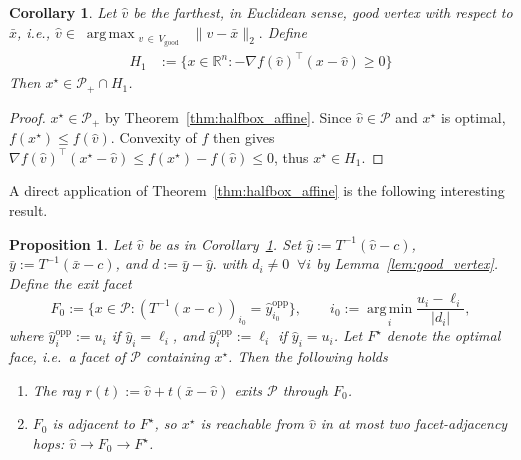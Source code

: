 \documentclass[pdflatex,sn-mathphys-num]{sn-jnl}%
\theoremstyle{thmstyleone}%
\newtheorem{proposition}[theorem]{Proposition}%
\newtheorem{corollary}[theorem]{Corollary}%
\theoremstyle{thmstyletwo}%
\theoremstyle{thmstylethree}%
\theoremstyle{thmstylethree}%
\begin{document}
\begin{corollary}\label{cor:three_halfspaces}
Let $\hat v$ be the farthest, in Euclidean sense, good vertex with respect to $\bar x$, i.e., $
  \hat v \in \; \operatorname*{arg\,max}_{\substack{v\,\in\, V_\text{good}}}\;
                \|v - \bar x\|_2. $
Define
\begin{align*}
  H_1 &:= \bigl\{x\in\mathbb{R}^n : {-}\nabla f(\hat v)^\top(x-\hat v)\ge 0\bigr\}
\end{align*}
Then $x^\star \in \mathcal P_+\cap H_1$.
\end{corollary}

\begin{proof}
$x^\star\in\mathcal{P}_+$ by Theorem~\ref{thm:halfbox_affine}.
Since $\hat v\in\mathcal{P}$ and $x^\star$ is optimal, $f(x^\star)\le f(\hat v)$.
Convexity of $f$ then gives
 $\nabla f(\hat v)^\top(x^\star - \hat v)\le f(x^\star)-f(\hat v)\le 0$, thus $x^\star \in H_1$. 
\end{proof}

A direct application of Theorem~\ref{thm:halfbox_affine} is the following interesting result. 

\begin{proposition}\label{prop:two_hops}
Let $\hat{v}$ be as in Corollary~\ref{cor:three_halfspaces}. Set $\hat{y}:=T^{-1}(\hat{v}-c)$, $\bar{y}:=T^{-1}(\bar{x}-c)$, and
$d := \bar{y}-\hat{y}.
$ with $d_i \ne 0 \;\;\forall i$ by Lemma~\ref{lem:good_vertex}.  
Define the \emph{exit facet}
\[
  F_0 := \bigl\{x\in\mathcal{P} : (T^{-1}(x-c))_{i_0}=\hat{y}^{\mathrm{opp}}_{i_0}\bigr\},
  \qquad
  i_0 := \operatorname*{arg\,min}_{i}\frac{u_i-\ell_i}{|d_i|},
\]
where $\hat{y}^{\mathrm{opp}}_i := u_i$ if $\hat{y}_i=\ell_i$, and $\hat{y}^{\mathrm{opp}}_i := \ell_i$ if $\hat{y}_i=u_i$.
Let $F^\star$ denote the optimal face, i.e.\ a facet of $\mathcal{P}$ containing $x^\star$.
Then the following holds
\begin{enumerate}
  \item[(i)] The ray $r(t):=\hat{v}+t(\bar{x}-\hat{v})$ exits $\mathcal{P}$ through $F_0$.
  \item[(ii)] $F_0$ is adjacent to $F^\star$, so $x^\star$ is reachable from $\hat{v}$
  in at most \emph{two} facet-adjacency hops: $\hat{v}\to F_0\to F^\star$.
\end{enumerate}
\end{proposition}
\end{document}
